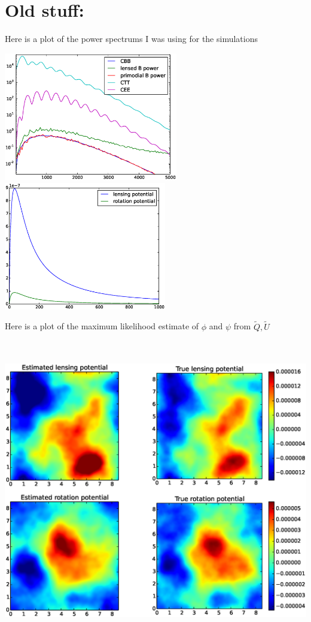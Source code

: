 \documentclass[noinfoline]{imsart}
\begin{document}
\section{Old stuff:}
Here is a plot of the power spectrums I was using for the simulations
\begin{center}
\includegraphics[height = 2.2in]{spectrum1.eps}%
\includegraphics[height = 2.2in]{spectrum2.eps}
\end{center}
\newpage
Here is a plot of the maximum likelihood estimate of $\phi$ and $\psi$ from $\tilde Q, \tilde U$
\begin{center}
\includegraphics[height = 5.2in]{images.eps}
\end{center}
\end{document}
